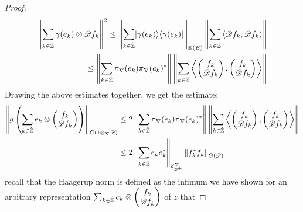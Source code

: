 \begin{proof}
	\begin{align*}
		\left \Vert \sum_{k\in \hat{\mathbb{Z}}} \gamma(e_k)\otimes \mathscr{D} f_k \right \Vert^2 \leq \left \Vert \sum_{k\in \hat{\mathbb{Z}}} \lvert \gamma(e_k) \rangle\langle \gamma(e_k) \rvert \right \Vert_{\mathbb{K}(E)}\left \Vert \sum_{k\in \hat{\mathbb{Z}}} \left \langle \mathscr{D} f_k,\mathscr{D} f_k \right \rangle \right \Vert \\
		\leq \left \Vert \sum_{k\in \hat{\mathbb{Z}}} \pi_{\nabla}(e_k)\pi_\nabla(e_k)^* \right \Vert\left \Vert \sum_{k\in \hat{\mathbb{Z}} } \left \langle \begin{pmatrix}f_k \\ \mathscr{D} f_k\end{pmatrix},\begin{pmatrix}f_k \\ \mathscr{D} f_k\end{pmatrix} \right \rangle  \right \Vert
	\end{align*}
	Drawing the above estimates together, we get the estimate:
	\begin{align*}
		\left \Vert g\left ( \sum_{k\in \hat{\mathbb{Z}}} e_k \otimes \begin{pmatrix} f_k \\ \mathscr{D} f_k \end{pmatrix} \right ) \right \Vert_{G(1\otimes_\nabla \mathscr{D})} &\leq 2\left \Vert \sum_{k\in \hat{\mathbb{Z}}} \pi_{\nabla}(e_k)\pi_\nabla(e_k)^* \right \Vert\left \Vert \sum_{k\in \hat{\mathbb{Z}} } \left \langle \begin{pmatrix}f_k \\ \mathscr{D} f_k\end{pmatrix},\begin{pmatrix}f_k \\ \mathscr{D} f_k\end{pmatrix} \right \rangle  \right \Vert \\
		&\leq 2\left \Vert \sum_{k\in \hat{\mathbb{Z}}} e_ke_k^* \right \Vert_{\mathcal{E}^\nabla_{\mathcal{B}^+}}\left \Vert f_k^*f_k \right \Vert_{G(\mathscr{D})}
	\end{align*}
	recall that the Haagerup norm is defined as the infimum 
	we have shown for an arbitrary representation $\sum_{k\in \hat{\mathbb{Z}}} e_k \otimes \begin{pmatrix} f_k \\ \mathscr{D} f_k \end{pmatrix}$ of $z$ that 

\end{proof}
